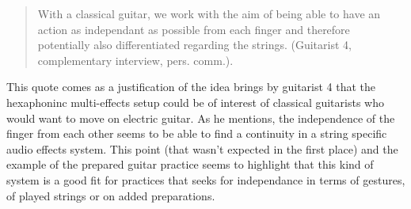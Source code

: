 \documentclass{article}
\begin{document}
\begin{quote}
With a classical guitar, we work with the aim of being able to have an action as independant as possible from each finger and therefore potentially also differentiated regarding the strings. (Guitarist 4, complementary interview, pers. comm.).
\end{quote}

This quote comes as a justification of the idea brings by guitarist 4 that the hexaphoninc multi-effects setup could be of interest of classical guitarists who would want to move on electric guitar. As he mentions, the independence of the finger from each other seems to be able to find a continuity in a string specific audio effects system. This point (that wasn't expected in the first place) and the example of the prepared guitar practice seems to highlight that this kind of system is a good fit for practices that seeks for independance in terms of gestures, of played strings or on added preparations.

%

\end{document}
